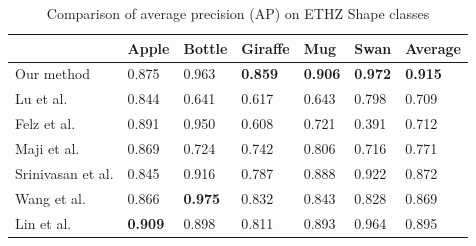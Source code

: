\documentclass[journal]{IEEEtran}
\begin{document}
\begin{table}[!t]
\renewcommand{\arraystretch}{1.3}
\caption{Comparison of average precision (AP) on ETHZ Shape classes}
\label{tab:1}
\centering
\scriptsize
\begin{tabular}{l|llllll}
\hline
& Apple & Bottle & Giraffe & Mug & Swan & Average \\
\hline
Our method              & 0.875                 & 0.963         &\textbf{0.859} &\textbf{0.906} &\textbf{0.972} &\textbf{0.915} \\
Lu et al.\cite{lu2009}  & 0.844                 & 0.641         & 0.617         & 0.643         & 0.798         & 0.709 \\
Felz et al.\cite{felzenszwalb2007} & 0.891      & 0.950         & 0.608         & 0.721         & 0.391         & 0.712 \\
Maji et al.\cite{maji2009}  & 0.869             & 0.724         & 0.742         & 0.806         & 0.716         & 0.771 \\
Srinivasan et al.\cite{srinivasan2010}  & 0.845 & 0.916         & 0.787         & 0.888         & 0.922         & 0.872 \\
Wang et al.\cite{wang2012} & 0.866              &\textbf{0.975} & 0.832         & 0.843         & 0.828         & 0.869 \\
Lin et al.\cite{lin2012}  &\textbf{0.909}       & 0.898         & 0.811         & 0.893         & 0.964         & 0.895 \\
\hline
\end{tabular}
\end{table}
\end{document}
